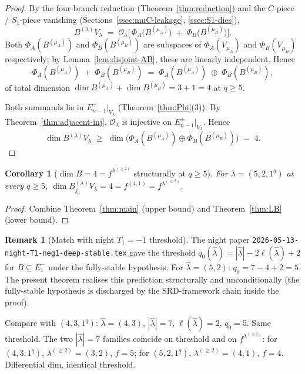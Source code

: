\documentclass[11pt]{article}
\newtheorem{corollary}[theorem]{Corollary}
\theoremstyle{definition}
\newtheorem{remark}[theorem]{Remark}
\begin{document}
\begin{proof}
By the four-branch reduction (Theorem~\ref{thm:reduction}) and the
$C$-piece / $S_1$-piece vanishing (Sections~\ref{ssec:muC-leakage},
\ref{ssec:S1-dies}),
\[
   B^{(\lambda)} V_\lambda
   \;=\; \mathcal{O}_\lambda\!\Big[\,
      \Phi_A\!\big(B^{(\mu_A)}\big) \;+\; \Phi_B\!\big(B^{(\mu_B)}\big)
   \Big].
\]
Both $\Phi_A(B^{(\mu_A)})$ and $\Phi_B(B^{(\mu_B)})$ are subspaces of
$\Phi_A(V_{\mu_A})$ and $\Phi_B(V_{\mu_B})$ respectively; by
Lemma~\ref{lem:disjoint-AB}, these are linearly independent. Hence
\[
   \Phi_A(B^{(\mu_A)}) \;+\; \Phi_B(B^{(\mu_B)})
   \;=\; \Phi_A(B^{(\mu_A)}) \;\oplus\; \Phi_B(B^{(\mu_B)}),
\]
of total dimension $\dim B^{(\mu_A)} + \dim B^{(\mu_B)} = 3 + 1 = 4$
at $q \ge 5$.

Both summands lie in $E_{n-1}^+|_{V_\lambda}$ (Theorem~\ref{thm:Phi}(3)).
By Theorem~\ref{thm:adjacent-inj}, $\mathcal{O}_\lambda$ is injective on
$E_{n-1}^+|_{V_\lambda}$. Hence
\[
   \dim B^{(\lambda)} V_\lambda
   \;\ge\; \dim \big(\Phi_A(B^{(\mu_A)}) \oplus \Phi_B(B^{(\mu_B)})\big)
   \;=\; 4.
\]
\end{proof}

\begin{corollary}[$\dim B = 4 = f^{\lambda^{(\ge 2)}}$ structurally at $q \ge 5$]
\label{cor:dim4}
For $\lambda = (5, 2, 1^q)$ at every $q \ge 5$,
$\dim B^{(\lambda)}_{j_0} V_\lambda = 4 = f^{(4, 1)} =
f^{\lambda^{(\ge 2)}}$.
\end{corollary}

\begin{proof}
Combine Theorem~\ref{thm:main} (upper bound) and Theorem~\ref{thm:LB}
(lower bound).
\end{proof}

\begin{remark}[Match with night $T_1 = -1$ threshold]\label{rem:match-night}
The night paper \texttt{2026-05-13-night-T1-neg1-deep-stable.tex} gave
the threshold $q_0(\hat\lambda) = |\hat\lambda| - 2\ell(\hat\lambda) + 2$
for $B \subseteq E_1^-$ under the fully-stable hypothesis. For
$\hat\lambda = (5, 2)$: $q_0 = 7 - 4 + 2 = 5$. The present theorem
realises this prediction structurally and unconditionally (the
fully-stable hypothesis is discharged by the SRD-framework chain
inside the proof).

Compare with $(4, 3, 1^q)$: $\hat\lambda = (4, 3)$, $|\hat\lambda| =
7$, $\ell(\hat\lambda) = 2$, $q_0 = 5$. Same threshold. The two
$|\hat\lambda| = 7$ families coincide on threshold and on
$f^{\lambda^{(\ge 2)}}$: for $(4, 3, 1^q)$, $\lambda^{(\ge 2)} = (3, 2)$,
$f = 5$; for $(5, 2, 1^q)$, $\lambda^{(\ge 2)} = (4, 1)$, $f = 4$.
Differential dim, identical threshold.
\end{remark}
\end{document}
